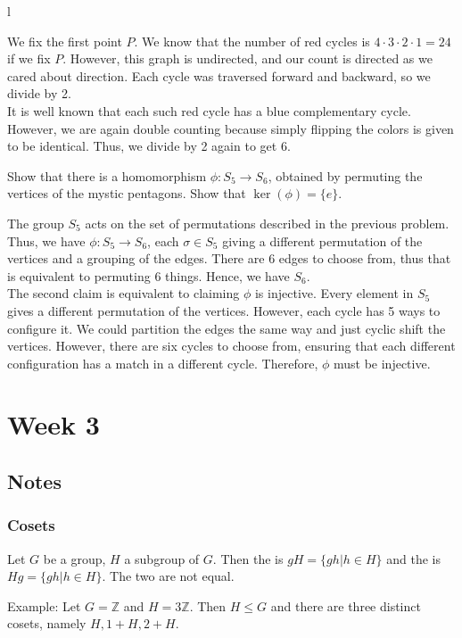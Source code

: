 l\documentclass{scrartcl}
\begin{document}
\begin{soln}
	We fix the first point $P$. We know that the number of red cycles is $4 \cdot 3 \cdot 2 \cdot 1 = 24$ if we fix $P$. However, this graph is undirected, and our count is directed as we cared about direction. Each cycle was traversed forward and backward, so we divide by 2. \\
	It is well known that each such red cycle has a blue complementary cycle. However, we are again double counting because simply flipping the colors is given to be identical. Thus, we divide by 2 again to get 6.
\end{soln}

\begin{problem}[24]
    Show that there is a homomorphism $\phi : S_5 \rightarrow S_6$, obtained by permuting the vertices of the mystic pentagons. Show that $\ker(\phi) = \{e\}$.
\end{problem}

\begin{soln}
    The group $S_5$ acts on the set of permutations described in the previous problem. Thus, we have $\phi : S_5 \rightarrow S_6$, each $\sigma \in S_5$ giving a different permutation of the vertices and a grouping of the edges. There are $6$ edges to choose from, thus that is equivalent to permuting $6$ things. Hence, we have $S_6$. \\
    The second claim is equivalent to claiming $\phi$ is injective. Every element in $S_5$ gives a different permutation of the vertices. However, each cycle has 5 ways to configure it. We could partition the edges the same way and just cyclic shift the vertices. However, there are six cycles to choose from, ensuring that each different configuration has a match in a different cycle. Therefore, $\phi$ must be injective.
\end{soln}

\section{Week 3}
\subsection{Notes}
\subsubsection{Cosets}
\begin{definition}
    Let $G$ be a group, $H$ a subgroup of $G$. Then the  is $gH = \{gh | h \in H\}$ and the  is $Hg = \{gh | h \in H\}$. The two are not equal.
\end{definition}
Example: Let $G = \mathbb{Z}$ and $H = 3\mathbb{Z}$. Then $H \le G$ and there are three distinct cosets, namely $H, 1+H, 2+H$.
\end{document}

